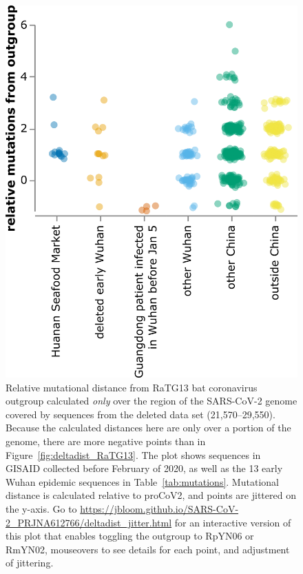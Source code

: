 \documentclass[9pt,twocolumn,twoside]{gsajnl_modified}
\begin{document}
\begin{figure}
\centering
\includegraphics[width=0.75\linewidth]{figures/Figure_4.jpg}
\caption{
Relative mutational distance from RaTG13 bat coronavirus outgroup calculated \emph{only} over the region of the SARS-CoV-2 genome covered by sequences from the deleted data set (21,570--29,550).
Because the calculated distances here are only over a portion of the genome, there are more negative points than in Figure~\ref{fig:deltadist_RaTG13}.
The plot shows sequences in GISAID collected before February of 2020, as well as the 13 early Wuhan epidemic sequences in Table~\ref{tab:mutations}.
Mutational distance is calculated relative to proCoV2, and points are jittered on the y-axis.
Go to \url{https://jbloom.github.io/SARS-CoV-2_PRJNA612766/deltadist_jitter.html} for an interactive version of this plot that enables toggling the outgroup to RpYN06 or RmYN02, mouseovers to see details for each point, and adjustment of jittering.
\label{fig:deltadist_jitter}
}
\end{figure}
\end{document}
